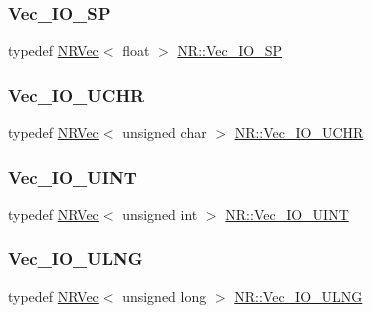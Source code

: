 \mbox{\label{namespaceNR_a761149b0404c64b2a5a0357c44d80b19}} 
\subsubsection{\texorpdfstring{Vec\_IO\_SP}{Vec\_IO\_SP}}
{\footnotesize\ttfamily typedef \mbox{\hyperlink{classNR_1_1NRVec}{N\+R\+Vec}}$<$ float $>$ \mbox{\hyperlink{namespaceNR_a761149b0404c64b2a5a0357c44d80b19}{N\+R\+::\+Vec\+\_\+\+I\+O\+\_\+\+SP}}}

\mbox{\label{namespaceNR_ad0cd08c957bbfcd9b612069da683fed4}} 
\subsubsection{\texorpdfstring{Vec\_IO\_UCHR}{Vec\_IO\_UCHR}}
{\footnotesize\ttfamily typedef \mbox{\hyperlink{classNR_1_1NRVec}{N\+R\+Vec}}$<$ unsigned char $>$ \mbox{\hyperlink{namespaceNR_ad0cd08c957bbfcd9b612069da683fed4}{N\+R\+::\+Vec\+\_\+\+I\+O\+\_\+\+U\+C\+HR}}}

\mbox{\label{namespaceNR_a2da77c23b3ef6c69b5ad3971441ea6bc}} 
\subsubsection{\texorpdfstring{Vec\_IO\_UINT}{Vec\_IO\_UINT}}
{\footnotesize\ttfamily typedef \mbox{\hyperlink{classNR_1_1NRVec}{N\+R\+Vec}}$<$ unsigned int $>$ \mbox{\hyperlink{namespaceNR_a2da77c23b3ef6c69b5ad3971441ea6bc}{N\+R\+::\+Vec\+\_\+\+I\+O\+\_\+\+U\+I\+NT}}}

\mbox{\label{namespaceNR_a3b5de5b305729eeca6289dfee2a39229}} 
\subsubsection{\texorpdfstring{Vec\_IO\_ULNG}{Vec\_IO\_ULNG}}
{\footnotesize\ttfamily typedef \mbox{\hyperlink{classNR_1_1NRVec}{N\+R\+Vec}}$<$ unsigned long $>$ \mbox{\hyperlink{namespaceNR_a3b5de5b305729eeca6289dfee2a39229}{N\+R\+::\+Vec\+\_\+\+I\+O\+\_\+\+U\+L\+NG}}}

